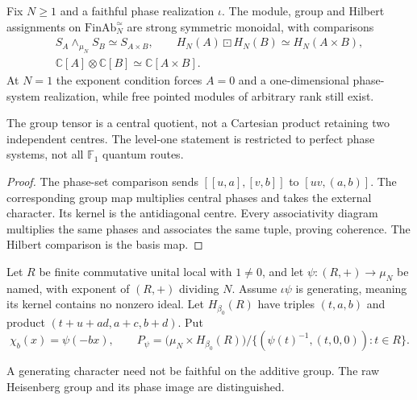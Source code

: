 \begin{theorem}
{\normalfont\statusProved}\quad Fix $N\geq1$ and a faithful phase realization
$\iota$. The module, group and Hilbert assignments on
$\mathrm{FinAb}_N^{\simeq}$ are strong symmetric monoidal, with comparisons
\begin{gather*}
S_A\wedge_{\mu_N}S_B\simeq S_{A\times B},\qquad
H_N(A)\boxdot H_N(B)\simeq H_N(A\times B),\\
\mathbb C[A]\otimes\mathbb C[B]\simeq\mathbb C[A\times B].
\end{gather*}
At $N=1$ the exponent condition forces $A=0$ and a one-dimensional
phase-system realization, while free pointed modules of arbitrary rank
still exist.
\end{theorem}
\begin{scope}The group tensor is a central quotient, not a Cartesian
product retaining two independent centres. The level-one statement is
restricted to perfect phase systems, not all $\mathbb F_1$ quantum routes.\end{scope}
\begin{proof}
The phase-set comparison sends $[[u,a],[v,b]]$ to $[uv,(a,b)]$.
The corresponding group map multiplies central phases and takes the
external character. Its kernel is the antidiagonal centre. Every
associativity diagram multiplies the same phases and associates the
same tuple, proving coherence. The Hilbert comparison is the basis map.
\end{proof}

\begin{definition}
Let $R$ be finite commutative unital local with $1\ne0$, and let
$\psi:(R,+)\to\mu_N$ be named, with exponent of $(R,+)$ dividing $N$.
Assume $\iota\psi$ is generating, meaning its kernel contains no nonzero
ideal. Let $H_{\beta_0}(R)$ have triples $(t,a,b)$ and product
$(t+u+ad,a+c,b+d)$. Put
\[
\chi_b(x)=\psi(-bx),\qquad
P_\psi=\bigl(\mu_N\times H_{\beta_0}(R)\bigr)
/\{(\psi(t)^{-1},(t,0,0)):t\in R\}.
\]
\end{definition}
\begin{scope}A generating character need not be faithful on the additive
group. The raw Heisenberg group and its phase image are distinguished.\end{scope}

